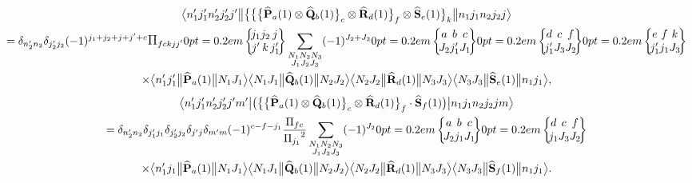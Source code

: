 \begin{multline*}
\braOketred{ n_{1}^{\prime} j_{1}^{\prime} n_{2}^{\prime} j_{2}^{\prime} j^{\prime}}{\bigl\{\bigl\{\bigl\{\widehat{\vect{P}}_{a}(1) \otimes \widehat{\vect{Q}}_{b}(1)\bigr\}_{c} \otimes \widehat{\vect{R}}_{d}(1)\bigr\}_{f} \otimes \widehat{\vect{S}}_{e}(1)\bigr\}_{k}}{n_{1} j_{1} n_{2} j_{2} j} \\
=\delta_{n_{2}^{\prime} n_{2}} \delta_{j_{2}^{\prime} j_{2}}(-1)^{j_{1}+j_{2}+j+j^{\prime}+c} \Fact{f c k j j^{\prime}}
\sixj{j_{1}}{j_{2}}{j}{j^{\prime}}{k}{j_{1}^{\prime}} \sum_{\substack{N_{1} N_{2} N_{3} \\ J_{1} J_{2} J_{3}}}(-1)^{J_{2}+J_{3}}
\sixj{a}{b}{c}{J_{2}}{j_{1}^{\prime}}{J_{1}}
\sixj{d}{c}{f}{j_{1}^{\prime}}{J_{3}}{J_{2}}
\sixj{e}{f}{k}{j_{1}^{\prime}}{j_{1}}{J_{3}} \\
\times
\braOketred{ n_{1}^{\prime} j_{1}^{\prime}}{\widehat{\vect{P}}_{a}(1)}{ N_{1} J_{1}}
\braOketred{ N_{1} J_{1}}{\widehat{\vect{Q}}_{b}(1)}{ N_{2} J_{2}}
\braOketred{ N_{2} J_{2}}{\widehat{\vect{R}}_{d}(1)}{ N_{3} J_{3}}
\braOketred{N_{3} J_{3}}{\widehat{\vect{S}}_{e}(1)}{ n_{1} j_{1}},
\end{multline*}
\begin{multline}
\braOket{ n_{1}^{\prime} j_{1}^{\prime} n_{2}^{\prime} j_{2}^{\prime} j^{\prime} m^{\prime}}{\bigl(\bigl\{\bigl\{\widehat{\vect{P}}_{a}(1) \otimes \widehat{\vect{Q}}_{b}(1)\bigr\}_{c} \otimes \widehat{\vect{R}}_{d}(1)\bigr\}_{f} \cdot \widehat{\vect{S}}_{f}(1)\bigr)}{n_{1} j_{1} n_{2} j_{2} j m} \\
=\delta_{n_{2}^{\prime} n_{2}} \delta_{j_{1}^{\prime} j_{1}} \delta_{j_{2}^{\prime} j_{2}} \delta_{j^{\prime} j} \delta_{m^{\prime} m}(-1)^{c-f-j_{1}} \frac{\Fact{f c}}{\Fact{j_{1}}^{2}} \sum_{\substack{N_{1} N_{2} N_{3} \\
J_{1} J_{2} J_{3}}}(-1)^{J_{2}}
\sixj{a}{b}{c}{J_{2}}{j_{1}}{J_{1}}
\sixj{d}{c}{f}{j_{1}}{J_{3}}{J_{2}} \\
\times
\braOketred{ n_{1}^{\prime} j_{1}}{\widehat{\vect{P}}_{a}(1)}{ N_{1} J_{1}}
\braOketred{ N_{1} J_{1}}{\widehat{\vect{Q}}_{b}(1)}{ N_{2} J_{2}}
\braOketred{ N_{2} J_{2}}{\widehat{\vect{R}}_{d}(1)}{ N_{3} J_{3}}
\braOketred{ N_{3} J_{3}}{\widehat{\vect{S}}_{f}(1)}{ n_{1} j_{1}}. \label{eq:13:1:49}
\end{multline}
